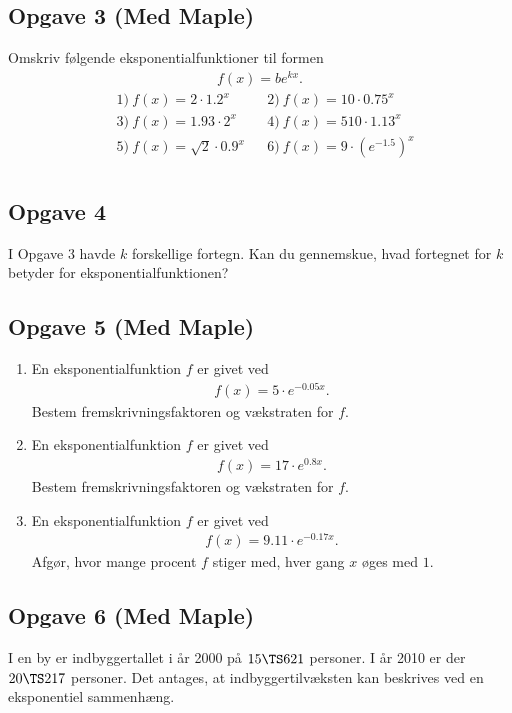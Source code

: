 \subsection*{Opgave 3 (Med Maple)}
Omskriv følgende eksponentialfunktioner til formen
\begin{align*}
	f(x) = be^{kx}.
\end{align*}
\begin{align*}
	&1) \ f(x) = 2\cdot 1.2^x   &    &2) \  f(x) = 10\cdot 0.75^x \\
	&3) \ f(x) = 1.93\cdot 2^x   &    &4) \  f(x) = 510 \cdot 1.13^x \\
	&5) \ f(x) = \sqrt{2}\cdot 0.9^x   &    &6) \  f(x) = 9 \cdot (e^{-1.5})^x \\
\end{align*}

\subsection*{Opgave 4}
I Opgave 3 havde $k$ forskellige fortegn. Kan du gennemskue, hvad fortegnet for $k$ betyder for eksponentialfunktionen?

\subsection*{Opgave 5 (Med Maple)}
\begin{enumerate}[label = \roman*)]
	\item En eksponentialfunktion $f$ er givet ved
	\begin{align*}
		f(x) = 5\cdot e^{-0.05x}.
	\end{align*}
	Bestem fremskrivningsfaktoren og vækstraten for $f$. 
	\item En eksponentialfunktion $f$ er givet ved
	\begin{align*}
		f(x) = 17 \cdot e^{0.8x}.
	\end{align*}
	Bestem fremskrivningsfaktoren og vækstraten for $f$. 
	\item En eksponentialfunktion $f$ er givet ved
	\begin{align*}
		f(x) = 9.11\cdot e^{-0.17x}.
	\end{align*}
	Afgør, hvor mange procent $f$ stiger med, hver gang $x$ øges med $1$. 
\end{enumerate}

\subsection*{Opgave 6 (Med Maple)}
I en by er indbyggertallet i år 2000 på $15\TS 621$ personer. I år 2010 er der $20\TS 217$ personer. 
Det antages, at indbyggertilvæksten kan beskrives ved en eksponentiel sammenhæng. 

